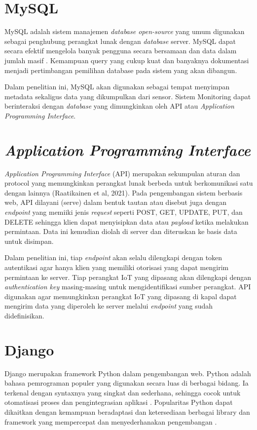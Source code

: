 \section{MySQL}

\noindent MySQL adalah sistem manajemen \textit{database open-source} yang umum digunakan sebagai penghubung perangkat lunak dengan \textit{database} server. MySQL dapat secara efektif mengelola banyak pengguna secara bersamaan dan data dalam jumlah masif \parencite{article:gomez}. Kemampuan query yang cukup kuat dan banyaknya dokumentasi menjadi pertimbangan pemilihan database pada sistem yang akan dibangun.

Dalam penelitian ini, MySQL akan digunakan sebagai tempat menyimpan metadata sekaligus data yang dikumpulkan dari sensor. Sistem Monitoring dapat berinteraksi dengan \textit{database} yang dimungkinkan oleh API atau \textit{Application Programming Interface}.


\section{\textit{Application Programming Interface}}
\textit{Application Programming Interface} (API) merupakan sekumpulan aturan dan protocol yang memungkinkan perangkat lunak berbeda untuk berkomunikasi satu dengan lainnya (Raatikainen et al, 2021). Pada pengembangan sistem berbasis web, API dilayani (serve) dalam bentuk tautan atau disebut juga dengan \textit{endpoint} yang memiiki jenis \textit{request} seperti POST, GET, UPDATE, PUT, dan DELETE sehingga klien dapat menyisipkan data atau \textit{payload} ketika melakukan permintaan. Data ini kemudian diolah di server dan diteruskan ke basis data untuk disimpan.

Dalam penelitian ini, tiap \textit{endpoint} akan selalu dilengkapi dengan token autentikasi agar hanya klien yang memiliki otorisasi yang dapat mengirim permintaan ke server. Tiap perangkat IoT yang dipasang akan dilengkapi dengan \textit{authentication key} masing-masing untuk mengidentifikasi sumber perangkat. API digunakan agar memungkinkan perangkat IoT yang dipasang di kapal dapat mengirim data yang diperoleh ke server melalui \textit{endpoint} yang sudah didefinisikan.

\section{Django}

\noindent 	Django merupakan framework Python dalam pengembangan web. Python adalah bahasa pemrograman populer yang digunakan secara luas di berbagai bidang. Ia terkenal dengan syntaxnya yang singkat dan sederhana, sehingga cocok untuk otomatisasi proses dan pengintegrasian aplikasi \cite{article:buhler}. Popularitas Python dapat dikaitkan dengan kemampuan beradaptasi dan ketersediaan berbagai library dan framework yang mempercepat dan menyederhanakan pengembangan \cite{article:malloy}.

